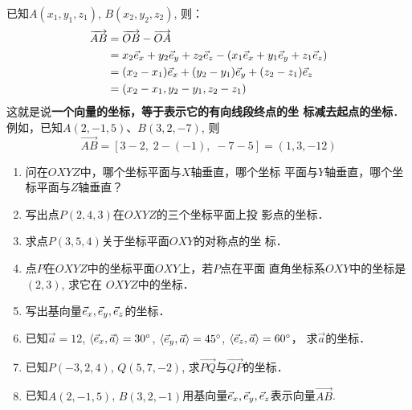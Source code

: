 \begin{figure}[htp]
    \centering
{}
    \caption{}
\end{figure}

已知$A(x_1,y_1,z_1)$, $B(x_2,y_2,z_2)$, 则：
\[\begin{split}
   \overrightarrow{AB}&=\overrightarrow{OB}-\overrightarrow{OA}\\
&=x_2\vec{e}_x+y_2\vec{e}_y+z_2\vec{e}_z-(x_1\vec{e}_x+y_1\vec{e}_y+z_1\vec{e}_z)\\
&=(x_2-x_1)\vec{e}_x+(y_2-y_1)\vec{e}_y+(z_2-z_1)\vec{e}_z\\
&=(x_2-x_1, y_2-y_1, z_2-z_1)
\end{split}\]
这就是说\textbf{一个向量的坐标，等于表示它的有向线段终点的坐
标减去起点的坐标}．例如，已知$A(2,-1,5)$、$B(3,
2,-7)$, 则
\[\Vec{AB}=[3-2,\; 2-(-1),\; -7-5]=(1,3,-12)\]

\begin{ex}
\begin{enumerate}
    \item 问在$OXYZ$中，哪个坐标平面与$X$轴垂直，哪个坐标
    平面与$Y$轴垂直，哪个坐标平面与$Z$轴垂直？
    \item 写出点$P(2,4,3)$在$OXYZ$的三个坐标平面上投
    影点的坐标．
    \item 求点$P(3,5,4)$关于坐标平面$OXY$的对称点的坐
    标．
    \item 点$P$在$OXYZ$中的坐标平面$OXY$上，若$P$点在平面
    直角坐标系$OXY$中的坐标是$(2,3)$, 求它在
    $OXYZ$中的坐标．
    \item 写出基向量$\vec{e}_x,\vec{e}_y,\vec{e}_z$的坐标．
    \item 已知$\vec{a}=12$, $\langle\vec{e}_x ,\vec{a}\rangle=30^{\circ}$, $\langle\vec{e}_y ,\vec{a}\rangle=45^{\circ}$, $\langle\vec{e}_z ,\vec{a}\rangle=60^{\circ}$，
求$\vec{a}$的坐标．
    \item 已知$P(-3,2,4)$, $Q(5,7,-2)$, 求$\Vec{PQ}$与$\Vec{QP}$的坐标．
    \item 已知$A(2,-1,5)$, $B(3,2,-1)$用基向量$\vec{e}_x,\vec{e}_y,\vec{e}_z$表示向量$\Vec{AB}$.
\end{enumerate}
\end{ex}

